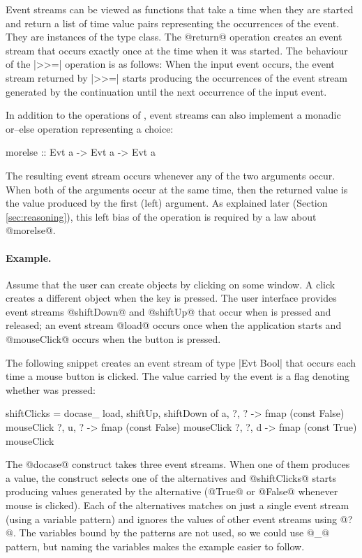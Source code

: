\documentclass[preprint]{sigplanconf}
\begin{document}
Event streams can be viewed as functions that take a time when they are started and return a list of 
time value pairs representing the occurrences of the event. They are instances of the  
type class. The @return@ operation creates an event stream that occurs exactly once at the time when 
it was started. The behaviour of the |>>=| operation is as follows: When the input event occurs, the 
event stream returned by |>>=| starts producing the occurrences of the event stream generated by the 
continuation until the next occurrence of the input event.

In addition to the operations of , event streams can also implement a monadic or--else
operation representing a choice:

\begin{code}
morelse :: Evt a -> Evt a -> Evt a
\end{code}
The resulting event stream occurs whenever any of the two arguments occur. When both of the 
arguments occur at the same time, then the returned value is the value produced by the first (left)
argument. As explained later (Section \ref{sec:reasoning}), this left bias of the operation is 
required by a law about @morelse@.

\paragraph{Example.} Assume that the user can create objects by clicking on some window. A click 
creates a different object when the  key is pressed. The user interface provides event 
streams @shiftDown@ and @shiftUp@ that occur when  is pressed and released; an event 
stream @load@ occurs once when the application starts and @mouseClick@ occurs when the button is pressed.

The following snippet creates an event stream of type |Evt Bool| that occurs each time a mouse 
button is clicked. The value carried by the event is a flag denoting whether  was
pressed:

\begin{code}
shiftClicks = docase_ load, shiftUp, shiftDown of
  a, ?, ?  -> fmap (const False) mouseClick
  ?, u, ?  -> fmap (const False) mouseClick
  ?, ?, d  -> fmap (const True) mouseClick
\end{code}
The @docase@ construct takes three event streams. When one of them produces a value,
the construct selects one of the alternatives and @shiftClicks@ starts producing values generated
by the alternative (@True@ or @False@ whenever mouse is clicked). Each of the alternatives matches
on just a single event stream (using a variable pattern) and ignores the values of other event 
streams using @?@. The variables bound by the patterns are not used, so we could use @_@ pattern, 
but naming the variables makes the example easier to follow.
\end{document}
